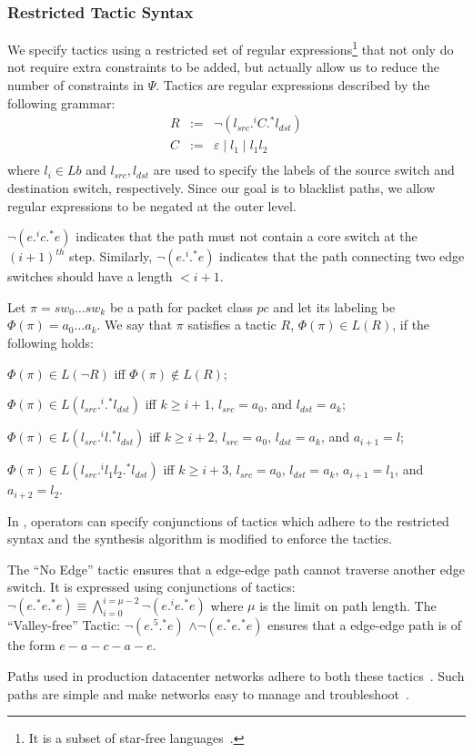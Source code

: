 \subsubsection{Restricted Tactic Syntax} 
We specify tactics using a restricted set of regular expressions\footnote{
	It is a subset of star-free languages~\cite{starfree}.}
 that not only do not require extra constraints to be added,
but actually allow us to reduce the number of constraints in $\Psi$.
Tactics are regular expressions described by the following grammar:
$$\begin{array}{rcl}
R  &  :=  &  \neg (l_{src} .^i C .^* l_{dst}) \\
C  &  :=  &  \varepsilon \mid l_1 \mid l_1 l_2\\
\end{array}$$
where $l_i\in Lb$ and $l_{src}, l_{dst}$ are used to specify the labels of the source switch 
and destination switch, respectively.
Since our goal is to blacklist paths, we allow regular expressions to be negated at the outer level. 
\begin{example}
 $\neg (e .^i c .^* e)$ indicates that the path must not contain a core switch at the $(i+1)^{th}$ step. 
 Similarly, $\neg (e .^i .^* e)$ indicates that the path connecting two edge switches should have a length $ < i + 1$. 
\end{example}

Let $\pi = sw_0\ldots sw_k$ be a path for packet class $pc$
and let its labeling be $\Phi(\pi)= a_0\ldots a_k$.
We say that $\pi$ satisfies a tactic $R$,  $\Phi(\pi) \in L(R)$, if the following
holds:
\begin{compact2itemize}
\item $\Phi(\pi) \in L(\neg R)$ iff $\Phi(\pi) \not\in L(R)$;
\item $\Phi(\pi) \in L( l_{src} .^i .^* l_{dst})$ iff $k\geq i+1$, $l_{src}= a_0$, and $l_{dst}= a_k$; 
\item $\Phi(\pi)  \in L (l_{src} .^i l.^* l_{dst})$ iff $k\geq i+2$, $l_{src}= a_0$, $l_{dst}= a_k$, and $a_{i+1}=l$;
\item $\Phi(\pi)  \in L( l_{src} .^i l_1 l_2.^* l_{dst})$ iff $k\geq i+3$, $l_{src}= a_0$, $l_{dst}= a_k$, $a_{i+1}=l_1$, and $a_{i+2}=l_2$.
\end{compact2itemize}
In \Name, operators can specify conjunctions of tactics which adhere to the restricted 
syntax and the synthesis algorithm is modified to enforce the tactics. 
\begin{example}
The ``No Edge'' tactic ensures that a edge-edge path
cannot traverse another edge switch. It is expressed using conjunctions of tactics:
$\neg (e .^* e .^* e)\equiv \bigwedge \limits_{i=0}^{i=\mu-2} \neg (e .^i e .^* e)$ where $\mu$ is the limit on path length. 
The ``Valley-free'' Tactic:  $\neg (e .^5 .^* e)$ $\wedge \neg (e .^* e .^* e)$  
ensures that a edge-edge path is of the form $e-a-c-a-e$. 
\end{example}
Paths used in production datacenter networks adhere to both these
tactics~\cite{vl2-sigcomm09,jupiterrising-sigcomm15}. Such paths are
simple and make networks easy to manage and
troubleshoot~\cite{benson:complexity:nsdi2009}.

